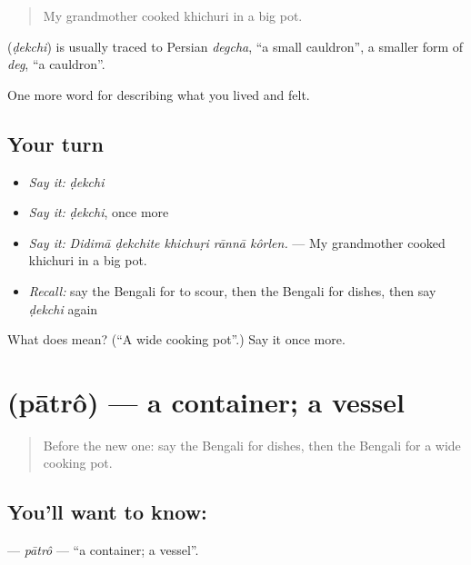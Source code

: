 \begin{quote}
My grandmother cooked khichuri in a big pot.
\end{quote}

\begin{cousinweb}
\textbf{} (\emph{ḍekchi}) is usually traced to Persian \emph{degcha}, \textquotedblleft{}a small cauldron\textquotedblright{}, a smaller form of \emph{deg}, \textquotedblleft{}a cauldron\textquotedblright{}.
\end{cousinweb}

\begin{grammarlens}[title={What you've built}]
One more word for describing what you lived and felt.
\end{grammarlens}

\subsection*{Your turn}
\begin{itemize}
\raggedright
  \item \emph{Say it:} \emph{ḍekchi}
  \item \emph{Say it:} \emph{ḍekchi}, once more
  \item \emph{Say it:} \emph{Didimā ḍekchite khichuṛi rānnā kôrlen.} — My grandmother cooked khichuri in a big pot.
  \item \emph{Recall:} say the Bengali for to scour, then the Bengali for dishes, then say \emph{ḍekchi} again
\end{itemize}

\begin{tcolorbox}[breakable,colback=teal!4,colframe=teal!35!black,title={Before you move on}]
What does  mean? (\textquotedblleft{}A wide cooking pot\textquotedblright{}.) Say it once more.
\end{tcolorbox}
\section[\texorpdfstring{\bn{পাত্র} (pātrô)}{পাত্র (pātrô)}]{ (pātrô) — a container; a vessel}

\label{lesson:BN-C511-patro}



\begin{quote}
Before the new one: say the Bengali for dishes, then the Bengali for a wide cooking pot.
\end{quote}

\subsection*{You'll want to know: }
\textbf{} — \emph{pātrô} — \textquotedblleft{}a container; a vessel\textquotedblright{}.

